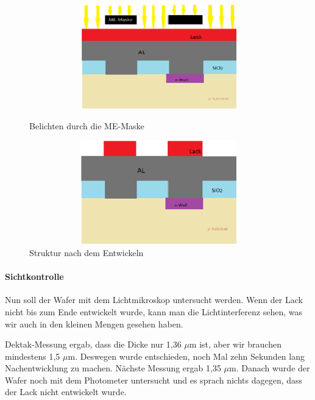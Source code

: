 \begin{figure}[H]
\centering
\begin{minipage}[hbt]{6cm}
    \centering
    \includegraphics[width=1\textwidth, height=4.5cm]{bilder/BelichtendurchMEMaske.png}
  \caption{Belichten durch die ME-Maske}
  \label{fig:BelichtendurchMEMaske}
\end{minipage}
\hfill
\begin{minipage}[hbt]{7cm}
    \centering
    \includegraphics[width=1\textwidth,height=4.5cm]{bilder/NachdemEntwickeln.png}
  \caption{Struktur nach dem Entwickeln }
  \label{fig:NachdemEntwickeln}
\end{minipage}

\end{figure}


\paragraph[Sichtkontrolle]{Sichtkontrolle}

Nun soll der Wafer mit dem Lichtmikroskop untersucht werden. Wenn der Lack nicht bis zum Ende entwickelt wurde, kann man die Lichtinterferenz sehen, was wir auch in den kleinen Mengen gesehen haben.

Dektak-Messung ergab, dass die Dicke nur 1,36 $\mu$m ist, aber wir brauchen mindestens 1,5 $\mu$m. Deswegen wurde entschieden, noch Mal zehn Sekunden lang Nachentwicklung zu machen. Nächste Messung ergab 1,35 $\mu$m. Danach wurde der Wafer noch mit dem Photometer untersucht und es sprach nichts dagegen, dass der Lack nicht entwickelt wurde.



